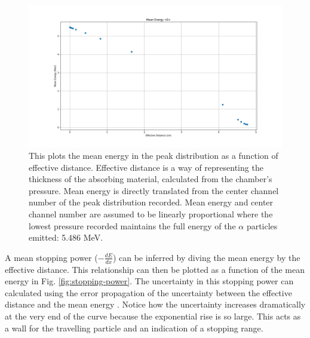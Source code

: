 \begin{figure}
\centering
\includegraphics[width=\textwidth]{mean_energy.png}
\caption{This plots the mean energy in the peak distribution as a function of effective distance. Effective distance is a way of representing the thickness of the absorbing material, calculated from the chamber’s pressure. Mean energy is directly translated from the center channel number of the peak distribution recorded. Mean energy and center channel number are assumed to be linearly proportional where the lowest pressure recorded maintains the full energy of the $\alpha$ particles emitted: 5.486 MeV.}
\label{fig:mean-energy}
\end{figure}

 A mean stopping power ($-\frac{dE}{dx}$) can be inferred by diving the mean energy by the effective distance. This relationship can then be plotted as a function of the mean energy in Fig. \ref{fig:stopping-power}. The uncertainty in this stopping power can calculated using the error propagation of the uncertainty between the effective distance and the mean energy \cite{taylor}. Notice how the uncertainty increases dramatically at the very end of the curve because the exponential rise is so large. This acts as a wall for the travelling particle and an indication of a stopping range.

